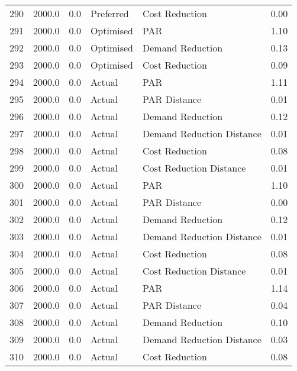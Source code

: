 \begin{longtable}{lrrllr}
290  &       2000.0 &     0.0 &      Preferred &             Cost Reduction &   0.00 \\
291  &       2000.0 &     0.0 &      Optimised &                        PAR &   1.10 \\
292  &       2000.0 &     0.0 &      Optimised &           Demand Reduction &   0.13 \\
293  &       2000.0 &     0.0 &      Optimised &             Cost Reduction &   0.09 \\
294  &       2000.0 &     0.0 &         Actual &                        PAR &   1.11 \\
295  &       2000.0 &     0.0 &         Actual &               PAR Distance &   0.01 \\
296  &       2000.0 &     0.0 &         Actual &           Demand Reduction &   0.12 \\
297  &       2000.0 &     0.0 &         Actual &  Demand Reduction Distance &   0.01 \\
298  &       2000.0 &     0.0 &         Actual &             Cost Reduction &   0.08 \\
299  &       2000.0 &     0.0 &         Actual &    Cost Reduction Distance &   0.01 \\
300  &       2000.0 &     0.0 &         Actual &                        PAR &   1.10 \\
301  &       2000.0 &     0.0 &         Actual &               PAR Distance &   0.00 \\
302  &       2000.0 &     0.0 &         Actual &           Demand Reduction &   0.12 \\
303  &       2000.0 &     0.0 &         Actual &  Demand Reduction Distance &   0.01 \\
304  &       2000.0 &     0.0 &         Actual &             Cost Reduction &   0.08 \\
305  &       2000.0 &     0.0 &         Actual &    Cost Reduction Distance &   0.01 \\
306  &       2000.0 &     0.0 &         Actual &                        PAR &   1.14 \\
307  &       2000.0 &     0.0 &         Actual &               PAR Distance &   0.04 \\
308  &       2000.0 &     0.0 &         Actual &           Demand Reduction &   0.10 \\
309  &       2000.0 &     0.0 &         Actual &  Demand Reduction Distance &   0.03 \\
310  &       2000.0 &     0.0 &         Actual &             Cost Reduction &   0.08 \\

\end{longtable}
